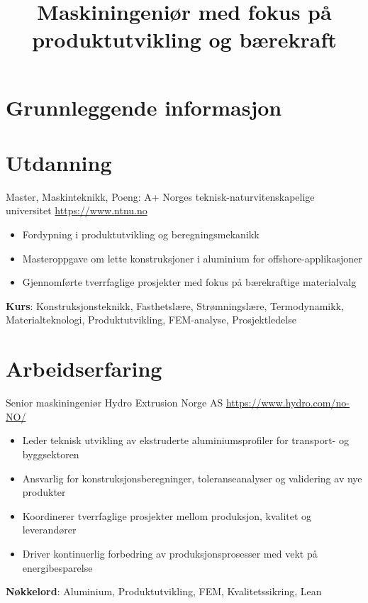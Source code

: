 \documentclass[a4paper, serif, 10pt]{moderncv}
\title{Maskiningeniør med fokus på produktutvikling og bærekraft}
\begin{document}
\maketitle

\section{Grunnleggende informasjon}

\section{Utdanning}

        {Master, Maskinteknikk, Poeng: A+}
        {Norges teknisk-naturvitenskapelige universitet}
        {\url{https://www.ntnu.no}}
        {}
        {\begin{itemize}
\item Fordypning i produktutvikling og beregningsmekanikk
\item Masteroppgave om lette konstruksjoner i aluminium for offshore-applikasjoner
\item Gjennomførte tverrfaglige prosjekter med fokus på bærekraftige materialvalg
\end{itemize}
\textbf{Kurs}: Konstruksjonsteknikk, Fasthetslære, Strømningslære, Termodynamikk, Materialteknologi, Produktutvikling, FEM-analyse, Prosjektledelse}
\section{Arbeidserfaring}

        {Senior maskiningeniør}
        {Hydro Extrusion Norge AS}
        {\url{https://www.hydro.com/no-NO/}}
        {}
        {\begin{itemize}
\item Leder teknisk utvikling av ekstruderte aluminiumsprofiler for transport- og byggsektoren
\item Ansvarlig for konstruksjonsberegninger, toleranseanalyser og validering av nye produkter
\item Koordinerer tverrfaglige prosjekter mellom produksjon, kvalitet og leverandører
\item Driver kontinuerlig forbedring av produksjonsprosesser med vekt på energibesparelse
\end{itemize}
\textbf{Nøkkelord}: Aluminium, Produktutvikling, FEM, Kvalitetssikring, Lean}
\end{document}
